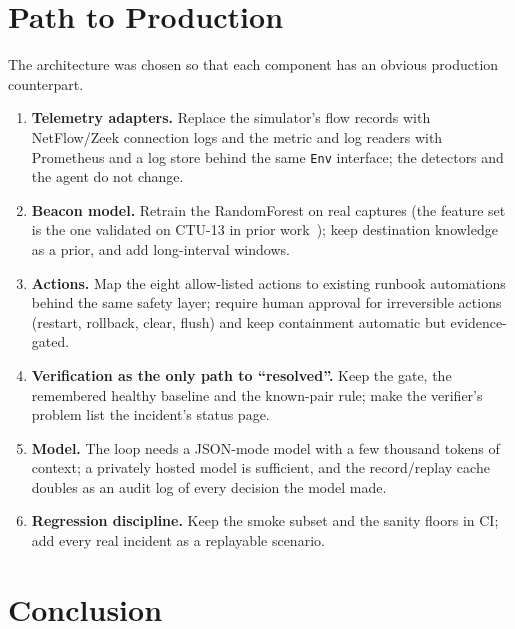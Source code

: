 \documentclass[11pt,a4paper]{article}
\newcommand{\code}[1]{\texttt{#1}}
\begin{document}
\section{Path to Production}
\label{sec:production}

The architecture was chosen so that each component has an obvious production counterpart.
\begin{enumerate}
  \item \textbf{Telemetry adapters.} Replace the simulator's flow records with NetFlow/Zeek
        connection logs and the metric and log readers with Prometheus and a log store behind the same
        \code{Env} interface; the detectors and the agent do not change.
  \item \textbf{Beacon model.} Retrain the RandomForest on real captures (the feature set is the one
        validated on CTU-13 in prior work~\cite{alharbi-thesis}); keep destination knowledge as a prior,
        and add long-interval windows.
  \item \textbf{Actions.} Map the eight allow-listed actions to existing runbook automations behind
        the same safety layer; require human approval for irreversible actions (restart, rollback,
        clear, flush) and keep containment automatic but evidence-gated.
  \item \textbf{Verification as the only path to ``resolved''.} Keep the gate, the remembered healthy
        baseline and the known-pair rule; make the verifier's problem list the incident's status
        page.
  \item \textbf{Model.} The loop needs a JSON-mode model with a few thousand tokens of context; a
        privately hosted model is sufficient, and the record/replay cache doubles as an audit log of
        every decision the model made.
  \item \textbf{Regression discipline.} Keep the smoke subset and the sanity floors in CI; add every
        real incident as a replayable scenario.
\end{enumerate}

\section{Conclusion}
\end{document}
